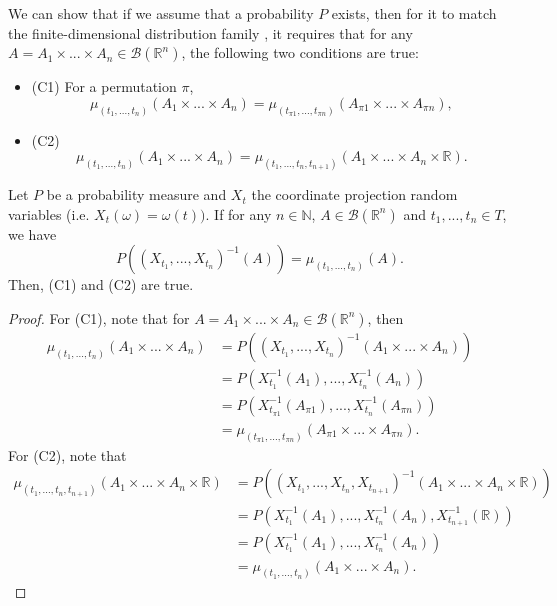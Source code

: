 We can show that if we assume that a probability $P$ exists, then
for it to match the finite-dimensional distribution family ,
it requires that for any $A = A_1 \times ... \times A_n \in \mathcal B(\mathbb R^n)$,
the following two conditions are true:
\begin{itemize}
	\item (C1) For a permutation $\pi$,
	      \begin{equation}
		      \mu_{(t_1,...,t_n)}(A_1\times...\times A_n) =
		      \mu_{(t_{\pi 1},...,t_{\pi n})}(A_{\pi 1}\times...\times A_{\pi n}),
		      \label{eq:consitency1}
	      \end{equation}
	\item (C2)
	      \begin{equation}
		      \mu_{(t_1,...,t_n)}(A_1\times...\times A_n) =
		      \mu_{(t_1,...,t_n, t_{n+1})}(A_1\times...\times A_n \times \mathbb R).
		      \label{eq:consitency2}
	      \end{equation}
\end{itemize}

\begin{proposition}
	Let $P$ be a probability measure and $X_t$ the coordinate projection random variables (i.e. $X_t(\omega) = \omega(t))$.
	If for any $n \in \mathbb N$, $A \in \mathcal B(\mathbb R^n)$ and $t_1,...,t_n \in T$, we have
	\begin{displaymath}
		P((X_{t_1},...,X_{t_n})^{-1}(A)) = \mu_{(t_1,...,t_n)}(A).
	\end{displaymath}
	Then, (C1) and (C2) are true.
\end{proposition}
\begin{proof}
	For (C1), note that for $A = A_1 \times ... \times A_n \in \mathcal B(\mathbb R^n)$, then
	\begin{align*}
		\mu_{(t_1,...,t_n)}(A_1\times...\times A_n) & =
		P((X_{t_1},...,X_{t_n})^{-1}(A_1\times ...\times A_n))                                                      \\
		                                            & =
		P(X_{t_1}^{-1}(A_1),...,X_{t_n}^{-1}(A_n))                                                                  \\
		                                            & =P(X_{t_{\pi 1}}^{-1}(A_{\pi 1}),...,X_{t_n}^{-1}(A_{\pi n})) \\
		                                            & =
		\mu_{(t_{\pi 1},...,t_{\pi n})}(A_{\pi 1}\times...\times A_{\pi n}).
	\end{align*}
	For (C2), note that
	\begin{align*}
		\mu_{(t_1,...,t_n,t_{n+1})}(A_1\times...\times A_n \times \mathbb R)
		 & = P((X_{t_1},...,X_{t_n}, X_{t_{n+1}})^{-1}(A_1\times ...\times A_n \times \mathbb R)) \\
		 & = P(X_{t_1}^{-1}(A_1),...,X_{t_n}^{-1}(A_n), X_{t_{n+1}}^{-1}(\mathbb R))              \\
		 & = P(X_{t_1}^{-1}(A_1),...,X_{t_n}^{-1}(A_n))                                           \\
		 & = \mu_{(t_1,...,t_n)}(A_1\times...\times A_n).
	\end{align*}
\end{proof}


